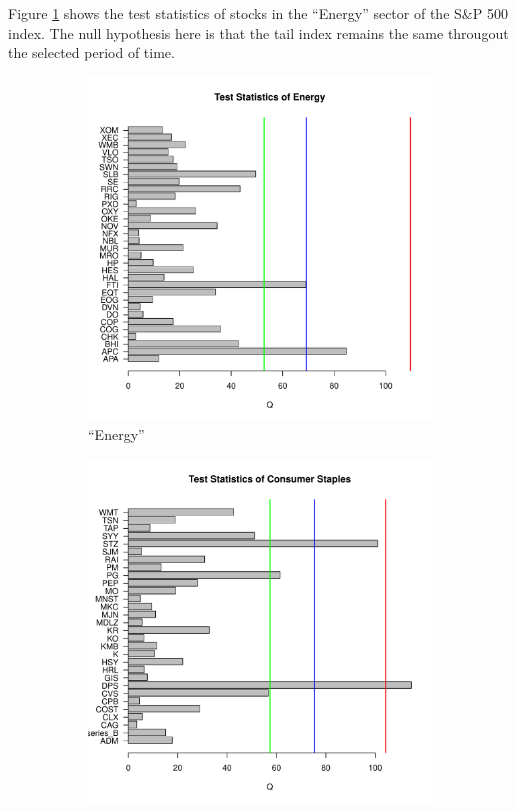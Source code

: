 \documentclass{article}
\begin{document}
Figure \ref{fig:Hoga_Energy_Single} shows the test statistics of
stocks in the ``Energy'' sector of the S\&P 500
index. The null hypothesis here is that the tail index remains the
same througout the selected period of time.
\begin{figure}[htb!]
  \begin{subfigure}[b]{0.5\linewidth}
    \includegraphics[width=\textwidth]{Hoga_Energy_Single.pdf}
    \caption{``Energy''}
    \label{fig:Hoga_Energy_Single}
  \end{subfigure}
  \begin{subfigure}[b]{0.5\linewidth}
    \includegraphics[width=\textwidth]{Hoga_Consumer_Staples_Single.pdf}

\end{subfigure}
\end{figure}
\end{document}
